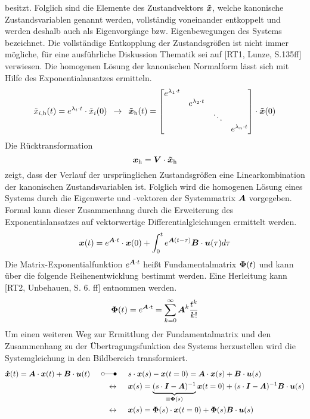 besitzt. Folglich sind die Elemente des Zustandvektors $\boldsymbol{\tilde{x}}$, welche kanonische Zustandsvariablen genannt werden, vollständig voneinander entkoppelt und werden deshalb auch als Eigenvorgänge bzw. Eigenbewegungen des Systems bezeichnet. Die vollständige Entkopplung der Zustandsgrößen ist nicht immer mögliche, für eine ausführliche Diskussion Thematik sei auf [RT1, Lunze, S.135ff] verwiesen.
Die homogenen Lösung der kanonischen Normalform lässt sich mit Hilfe des Exponentialansatzes ermitteln.
\begin{equation}
\tilde{x}_{i\text{,h}}(t) = e^{\lambda_i\cdot t}\cdot \tilde{x}_i(0) \hspace{5pt}\rightarrow\hspace{5pt} \boldsymbol{\tilde{x}}_{\text{h}}(t) = \begin{bmatrix}
e^{\lambda_{\text{1}}\cdot t} &  & \\
& e^{\lambda_{\text{2}}\cdot t}  & \\
&  & \ddots & \\
&  & & e^{\lambda_n\cdot t}
\end{bmatrix}\cdot \boldsymbol{\tilde{x}}(0)
\end{equation}
Die Rücktransformation
\begin{equation}
\boldsymbol{x}_{\text{h}} = \boldsymbol{V}\cdot \boldsymbol{\tilde{x}}_{\text{h}}
\end{equation}
zeigt, dass der Verlauf der ursprünglichen Zustandsgrößen eine Linearkombination der kanonischen Zustandsvariablen ist. Folglich wird die homogenen Lösung eines Systems durch die Eigenwerte und -vektoren der Systemmatrix $\boldsymbol{A}$ vorgegeben. 
Formal kann dieser Zusammenhang durch die Erweiterung des Exponentialansatzes auf vektorwertige Differentialgleichungen ermittelt werden.
\begin{equation}
\boldsymbol{x}(t) = e^{\boldsymbol{A}\cdot t}\cdot \boldsymbol{x}(0) + \int^t_0 e^{\boldsymbol{A}(t-\tau)}\boldsymbol{B}\cdot \boldsymbol{u}(\tau)d\tau
\label{eq_fMat_zeitbereich}
\end{equation}
Die Matrix-Exponentialfunktion $e^{\boldsymbol{A}\cdot t}$ heißt Fundamentalmatrix $\boldsymbol{\Phi}(t)$ und kann über die folgende Reihenentwicklung bestimmt werden. Eine Herleitung kann [RT2, Unbehauen, S. 6. ff] entnommen werden. 
\begin{equation}
\boldsymbol{\Phi}(t) = e^{\boldsymbol{A}\cdot t} = \sum^{\infty}_{k=0} \boldsymbol{A}^k\frac{t^k}{k!}
\end{equation}
Um einen weiteren Weg zur Ermittlung der Fundamentalmatrix und den Zusammenhang zu der Übertragungsfunktion des Systems herzustellen wird die Systemgleichung in den Bildbereich transformiert.
\begin{equation}
\begin{split}
\bs{\dot{x}}(t) = \bs{A}\cdot \bs{x}(t) + \bs{B}\cdot\bs{u}(t) \myLaplace &s\cdot\bs{x}(s) - \bs{x}(t=0) = \bs{A}\cdot \bs{x}(s) + \bs{B}\cdot \bs{u}(s)
\\
\leftrightarrow \hspace{15pt} &\bs{x}(s) = \underbrace{(s\cdot \bs{I} - \bs{A})^{-1}}_{\equiv \bs{\Phi}(s)}\bs{x}(t=0) + (s\cdot \bs{I}-\bs{A})^{-1}\bs{B}\cdot \bs{u}(s) 
\\
\leftrightarrow \hspace{15pt}&\bs{x}(s) = \bs{\Phi}(s)\cdot \bs{x}(t=0) +\bs{\Phi}(s)\bs{B}\cdot \bs{u}(s)
\end{split}
\label{eq_fMat_bildbereich}
\end{equation}
